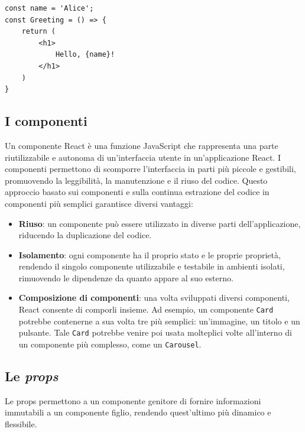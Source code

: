 \documentclass[target=bach,aauheader=,style=]{thud}
\begin{document}
\begin{lstlisting}[language=React, caption=Esempio di codice React]
const name = 'Alice';   
const Greeting = () => {
    return (
        <h1>
            Hello, {name}!
        </h1>
    )
} 
\end{lstlisting}

\subsection{I componenti}
Un componente React è una funzione JavaScript che rappresenta una parte riutilizzabile e autonoma di un'interfaccia utente in un'applicazione React. I componenti permettono di scomporre l'interfaccia in parti più piccole e gestibili, promuovendo la leggibilità, la manutenzione e il riuso del codice. Questo approccio basato sui componenti e sulla continua estrazione del codice in componenti più semplici garantisce diversi vantaggi:

\begin{itemize}
    \item \textbf{Riuso}: un componente può essere utilizzato in diverse parti dell'applicazione, riducendo la duplicazione del codice.
    \item \textbf{Isolamento}: ogni componente ha il proprio stato e le proprie proprietà, rendendo il singolo componente utilizzabile e testabile in ambienti isolati, rimuovendo le dipendenze da quanto appare al suo esterno.
    \item \textbf{Composizione di componenti}: una volta sviluppati diversi componenti, React consente di comporli insieme. Ad esempio, un componente \texttt{Card} potrebbe contenerne a sua volta tre più semplici: un'immagine, un titolo e un pulsante. Tale \texttt{Card} potrebbe venire poi usata molteplici volte all'interno di un componente più complesso, come un \texttt{Carousel}.
\end{itemize}

\subsection{Le \textit{props}}
Le props permettono a un componente genitore di fornire informazioni immutabili a un componente figlio, rendendo quest'ultimo più dinamico e flessibile.
\end{document}
